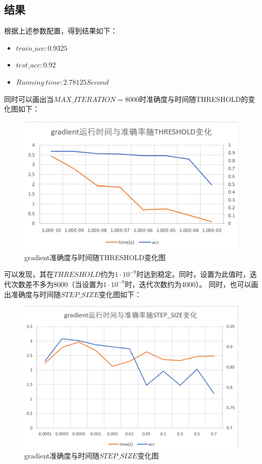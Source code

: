 \documentclass[UTF8]{ctexart}
\begin{document}
\subsection{结果}
根据上述参数配置，得到结果如下：
\begin{itemize}
    \item $train\_acc: 0.9325$
    \item $test\_acc: 0.92$
    \item $Running\ time: 2.78125 Second$
\end{itemize}
同时可以画出当$MAX\_ITERATION = 8000$时准确度与时间随THRESHOLD的变化图如下：
\begin{figure}[H]
    \centering
    \includegraphics[scale=0.8]{./img/gradient.png}
    \caption{gradient准确度与时间随THRESHOLD变化图}
\end{figure}
可以发现，其在$THRESHOLD$约为$1 \cdot 10^{-9}$时达到稳定。同时，设置为此值时，迭代次数差不多为8000（当设置为$1 \cdot 10^{-8}$时，迭代次数约为4000）。
同时，也可以画出准确度与时间随$STEP\_SIZE$变化图如下：
\begin{figure}[H]
    \centering
    \includegraphics[scale=0.8]{./img/gradient_step_size.png}
    \caption{gradient准确度与时间随$STEP\_SIZE$变化图}
\end{figure}
\end{document}
